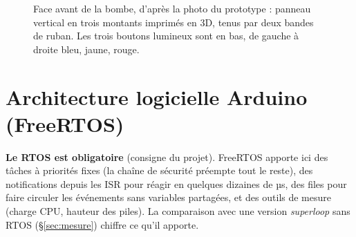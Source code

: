 \documentclass[11pt,a4paper]{article}
\begin{document}
\begin{figure}[htbp]
\caption{Face avant de la bombe, d'après la photo du prototype : panneau vertical en trois montants imprimés en 3D, tenus par deux bandes de ruban. Les trois boutons lumineux sont en bas, de gauche à droite bleu, jaune, rouge.}
\label{fig:bombe}
\end{figure}

\section{Architecture logicielle Arduino (FreeRTOS)}
\label{sec:logiciel}

\textbf{Le RTOS est obligatoire} (consigne du projet). FreeRTOS apporte ici des tâches à priorités fixes (la chaîne de sécurité préempte tout le reste), des notifications depuis les ISR pour réagir en quelques dizaines de µs, des files pour faire circuler les événements sans variables partagées, et des outils de mesure (charge CPU, hauteur des piles). La comparaison avec une version \emph{superloop} sans RTOS (\S\ref{sec:mesure}) chiffre ce qu'il apporte.
\end{document}
